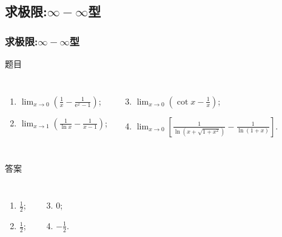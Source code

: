 \documentclass[
10pt,
aspectratio=43,
]{beamer}
\begin{document}
\subsection{求极限:$\displaystyle\infty-\infty$型}
\begin{frame}
	\frametitle{求极限:$\displaystyle\infty-\infty$型}
	\everymath{\displaystyle}
	\begin{block}{题目}
		\begin{columns}[onlytextwidth]
			\begin{enumerate}
				\item $\lim _{x \rightarrow 0}\left(\frac{1}{x}-\frac{1}{\mathrm{e}^x-1}\right)$;
				\item $\lim _{x \rightarrow 1}\left(\frac{1}{\ln x}-\frac{1}{x-1}\right)$;
			\end{enumerate}
			\begin{enumerate}
				\setcounter{enumi}{2}
				\item $\lim _{x \rightarrow 0}\left(\cot x-\frac{1}{x}\right)$;
				\item $\lim _{x \rightarrow 0}\left[\frac{1}{\ln \left(x+\sqrt{1+x^2}\right)}-\frac{1}{\ln (1+x)}\right]$.
			\end{enumerate}
		\end{columns}
	\end{block}

	\begin{exampleblock}{答案}
		\begin{columns}[onlytextwidth]
			\begin{enumerate}
				\pause
				\item $\frac12$;
				\item $\frac12$;
			\end{enumerate}
			\begin{enumerate}
				\setcounter{enumi}{2}
				\pause
				\item $0$;\vspace{0.2cm}
				\item $-\frac12$.
			\end{enumerate}
		\end{columns}
	\end{exampleblock}
\end{frame}
\end{document}
